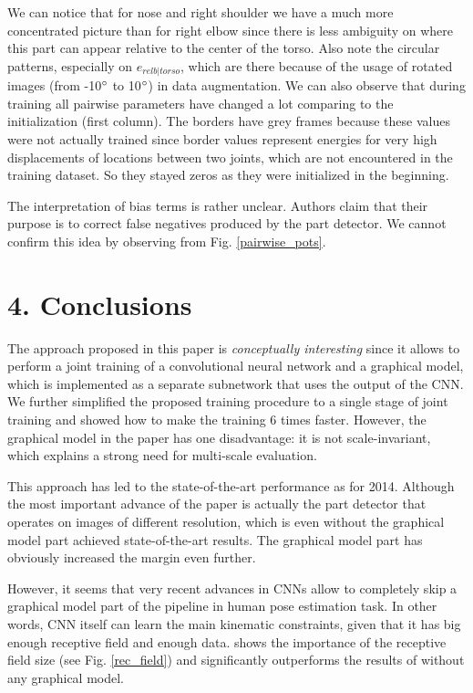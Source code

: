 \documentclass[a4paper,10pt]{article}
\begin{document}
	We can notice that for nose and right shoulder we have a much more concentrated picture than for right elbow since there is less ambiguity on where this part can appear relative to the center of the torso. Also note the circular patterns, especially on $e_{relb | torso}$, which are there because of the usage of rotated images (from -10$\degree$ to 10$\degree$) in data augmentation. We can also observe that during training all pairwise parameters have changed a lot comparing to the initialization (first column). The borders have grey frames because these values were not actually trained since border values represent energies for very high displacements of locations between two joints, which are not encountered in the training dataset. So they stayed zeros as they were initialized in the beginning.
	
	The interpretation of bias terms is rather unclear. Authors claim that their purpose is to correct false negatives produced by the part detector. We cannot confirm this idea by observing from Fig. \ref{pairwise_pots}.
	
    
    
    
    \section{4. Conclusions}
    The approach proposed in this paper is \textit{conceptually interesting} since it allows to perform a joint training of a convolutional neural network and a graphical model, which is implemented as a separate subnetwork that uses the output of the CNN. We further simplified the proposed training procedure to a single stage of joint training and showed how to make the training 6 times faster. However, the graphical model in the paper has one disadvantage: it is not scale-invariant, which explains a strong need for multi-scale evaluation.
    
    This approach has led to the state-of-the-art performance as for 2014. Although the most important advance of the paper is actually the part detector that operates on images of different resolution, which is even without the graphical model part achieved state-of-the-art results. The graphical model part has obviously increased the margin even further. 
    
    However, it seems that very recent advances in CNNs allow to completely skip a graphical model part of the pipeline in human pose estimation task. In other words, CNN itself can learn the main kinematic constraints, given that it has big enough receptive field and enough data. \cite{conv_pose_machines} shows the importance of the receptive field size (see Fig. \ref{rec_field}) and significantly outperforms the results of \cite{cnn_pgm_for_hpe} without any graphical model.
    
\end{document}
